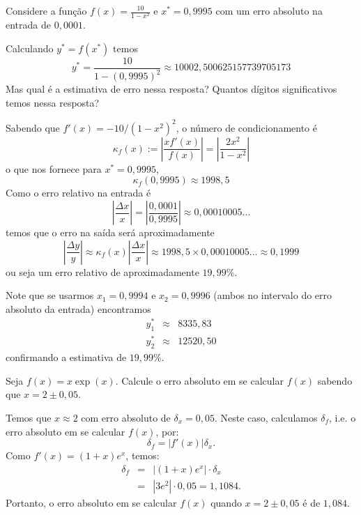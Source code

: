 \begin{ex}
 Considere a função $f(x) = \frac{10}{1-x^2}$ e $x^*=0,9995$ com um erro absoluto na entrada de $0,0001$. 
 
 Calculando $y^*=f(x^*)$ temos 
\begin{equation*}
   y^* = \frac{10}{1-(0,9995)^2} \approx 10002,500625157739705173
\end{equation*}
 Mas qual é a estimativa de erro nessa resposta? Quantos dígitos significativos temos nessa resposta?
 
Sabendo que $f'(x)=-10/(1-x^2)^2$, o número de condicionamento é 
\begin{equation*}
   \kappa_f(x) := \left| \frac{ x f'(x)}{f(x)} \right| = \left| \frac{ 2x^2}{1-x^2} \right|
\end{equation*}
o que nos fornece para $x^*=0,9995$,
\begin{equation*}
   \kappa_f(0,9995) \approx 1998,5
\end{equation*}
Como o erro relativo na entrada é 
\begin{equation*}
   \left|\frac{\Delta x}{x}\right| = \left|\frac{0,0001}{0,9995}\right| \approx  0,00010005...
\end{equation*}
temos que o erro na saída será aproximadamente
\begin{equation*}
   \left|\frac{\Delta y}{y}\right| \approx \kappa_f(x) \left|\frac{\Delta x}{x}\right| \approx  1998,5 \times 0,00010005... \approx 0,1999
\end{equation*}
ou seja um erro relativo de aproximadamente $19,99 \%$.

Note que se usarmos $x_1 = 0,9994$ e $x_2 = 0,9996$ (ambos no intervalo do erro absoluto da entrada) encontramos
\begin{eqnarray*}
   y_1^*  &\approx&  8335,83 \\
   y_2^*  &\approx& 12520,50
\end{eqnarray*}
confirmando a estimativa de $19,99 \%$.
\end{ex}



\begin{ex}
  Seja $f(x) = x\exp(x)$. Calcule o erro absoluto em se calcular $f(x)$ sabendo que $x = 2 \pm 0,05$.
\end{ex}
\begin{sol}
  Temos que $x\approx 2$ com erro absoluto de $\delta_x = 0,05$. Neste caso, calculamos $\delta_f$, i.e. o erro absoluto em se calcular $f(x)$, por:
  \begin{equation*}
    \delta_f = |f'(x)|\delta_x.
  \end{equation*}
Como $f'(x) = (1 + x)e^{x}$, temos:
\begin{eqnarray*}
  \delta_f &=& |(1 + x)e^{x}|\cdot\delta_x\\
  &=& |3e^2|\cdot 0,05 = 1,1084.
\end{eqnarray*}
Portanto, o erro absoluto em se calcular $f(x)$ quando $x=2\pm 0,05$ é de $1,084$.
\end{sol}

